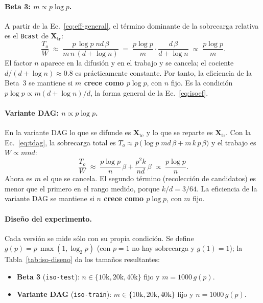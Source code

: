 \documentclass[11pt,a4paper]{article}
\newcommand{\ntr}{n}   %
\newcommand{\mte}{m}   %
\newcommand{\Xtr}{\mathbf{X}_{\text{tr}}}
\newcommand{\Xte}{\mathbf{X}_{\text{te}}}
\begin{document}
\paragraph{Beta 3: $\mte\propto p\log p$.}
A partir de la Ec.~\eqref{eq:eff-general}, el término dominante de la sobrecarga relativa es el
\texttt{Bcast} de $\Xtr$:
\begin{equation}
  \frac{T_o}{W}\;\approx\;\frac{p\,\log p\;\ntr d\,\beta}{\mte\,\ntr\,(d+\log\ntr)}
  \;=\;\frac{p\log p}{\mte}\cdot\frac{d\,\beta}{d+\log\ntr}\;\propto\;\frac{p\log p}{\mte}.
  \label{eq:iso-beta3}
\end{equation}
El factor $\ntr$ aparece en la difusión y en el trabajo y se cancela; el cociente
$d/(d+\log\ntr)\approx0.8$ es prácticamente constante. Por tanto, la eficiencia de la Beta~3 se
mantiene si \textbf{$\mte$ crece como $p\log p$}, con $\ntr$ fijo. Es la condición
$p\log p\propto\mte(d+\log\ntr)/d$, la forma general de la Ec.~\eqref{eq:isoef}.

\paragraph{Variante DAG: $\ntr\propto p\log p$.}
En la variante DAG lo que se difunde es $\Xte$ y lo que se reparte es $\Xtr$. Con la
Ec.~\eqref{eq:tdag}, la sobrecarga total es $T_o\approx p\,\big(\log p\;\mte d\,\beta+\mte\,k\,p\,\beta\big)$
y el trabajo es $W\propto\mte\ntr d$:
\begin{equation}
  \frac{T_o}{W}\;\approx\;\frac{p\log p}{\ntr}\,\beta+\frac{p^2 k}{\ntr d}\,\beta
  \;\propto\;\frac{p\log p}{\ntr}.
  \label{eq:iso-dag}
\end{equation}
Ahora es $\mte$ el que se cancela. El segundo término (recolección de candidatos) es menor que el
primero en el rango medido, porque $k/d=3/64$. La eficiencia de la variante DAG se mantiene si
\textbf{$\ntr$ crece como $p\log p$}, con $\mte$ fijo.

\paragraph{Diseño del experimento.}
Cada versión se mide sólo con su propia condición. Se define $g(p)=p\,\max(1,\log_2 p)$ (con $p=1$
no hay sobrecarga y $g(1)=1$); la Tabla~\ref{tab:iso-diseno} da los tamaños resultantes:
\begin{itemize}
  \item \textbf{Beta 3} (\texttt{iso-test}): $\ntr\in\{10\text{k},20\text{k},40\text{k}\}$ fijo y
        $\mte=1000\,g(p)$.
  \item \textbf{Variante DAG} (\texttt{iso-train}): $\mte\in\{10\text{k},20\text{k},40\text{k}\}$
        fijo y $\ntr=1000\,g(p)$.
\end{itemize}
\end{document}
